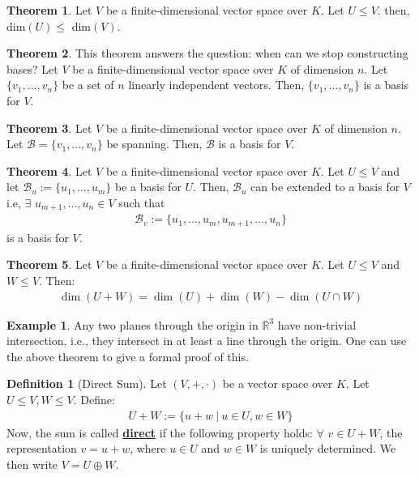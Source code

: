 \documentclass[11pt]{scrartcl}
\newcommand{\R}[0]{\mathbb{R}}
\theoremstyle{definition}
\newtheorem{theorem}{Theorem}
\newtheorem{definition}{Definition}
\newtheorem{ex}{Example}
\theoremstyle{remark}
\newcommand{\dfn}[1]{\textbf{\underline{#1}}}
\newcommand{\vsok}[0]{Let $(V, +, \cdot)$ be a vector space over $K$}
\begin{document}
\begin{theorem}
	Let $V$ be a finite-dimensional vector space over $K$. Let $U \leq V$. then, dim$(U) \leq $ dim$(V)$. 
\end{theorem}

\begin{theorem}
	This theorem answers the question: when can we stop constructing bases? Let $V$ be a finite-dimensional vector space over $K$ of dimension $n$. Let $\{ v_1, ..., v_n \}$ be a set of $n$ linearly independent vectors. Then, $\{ v_1, ..., v_n \}$ is a basis for $V$. 
\end{theorem}

\begin{theorem}
	Let $V$ be a finite-dimensional vector space over $K$ of dimension $n$. Let $\mathcal{B} = \{ v_1, ..., v_n \}$ be spanning. Then, $\mathcal{B}$ is a basis for $V$. 
\end{theorem}

\begin{theorem}
	Let $V$ be a finite-dimensional vector space over $K$. Let $U \leq V$ and let $\mathcal{B}_u := \{ u_1, ..., u_m \}$ be a basis for $U$. Then, $\mathcal{B}_u$ can be extended to a basis for $V$ i.e, $\exists$ $u_{m+1}, ..., u_n \in V$ such that
	\begin{align}
		\mathcal{B}_v := \{ u_1, ..., u_m, u_{m+1}, ..., u_n \} 	
	\end{align}
	is a basis for $V$. 
\end{theorem}

\begin{theorem}
	Let $V$ be a finite-dimensional vector space over $K$. Let $U \leq V$ and $W \leq V$. Then: 
	\begin{align}
		\operatorname{dim}(U+W) = \operatorname{dim}(U) + \operatorname{dim}(W) - \operatorname{dim}(U \cap W) 	
	\end{align}
\end{theorem}

\begin{ex}
	Any two planes through the origin in $\R^3$ have non-trivial intersection, i.e., they intersect in at least a line through the origin. One can use the above theorem to give a formal proof of this. 	
\end{ex}

\begin{definition}[Direct Sum]
	\vsok. Let $U \leq V, W \leq V$. Define: 
	\begin{align}
		U + W := \{ u+w\ |\ u \in U, w \in W \} 	
	\end{align}
	Now, the sum is called \dfn{direct} if the following property holds: $\forall$ $v \in U + W$, the representation $v = u + w$, where $u \in U$ and $w \in W$ is uniquely determined. We then write $V = U \oplus W$. 
\end{definition}
\end{document}
